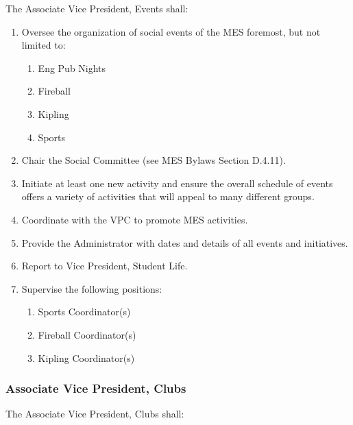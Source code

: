 The Associate Vice President, Events shall:

\begin{enumerate}
 \item
  Oversee the organization of social events of the MES foremost, but not
  limited to:

  \begin{enumerate}
   \item
    Eng Pub Nights
   \item
    Fireball
   \item
    Kipling
   \item
    Sports
  \end{enumerate}
 \item
  Chair the Social Committee (see MES Bylaws Section D.4.11).
 \item
  Initiate at least one new activity and ensure the overall schedule of
  events offers a variety of activities that will appeal to many
  different groups.
 \item
  Coordinate with the VPC to promote MES activities.
 \item
  Provide the Administrator with dates and details of all events and
  initiatives.
 \item
  Report to Vice President, Student Life.
 \item
  Supervise the following positions:

  \begin{enumerate}
   \item
    Sports Coordinator(s)
   \item
    Fireball Coordinator(s)
   \item
    Kipling Coordinator(s)

  \end{enumerate}
\end{enumerate}

\hypertarget{associate-vice-president-clubs}{%
 \subsubsection{Associate Vice President,
  Clubs}
 \label{associate-vice-president-clubs}}
The Associate Vice President, Clubs shall:

